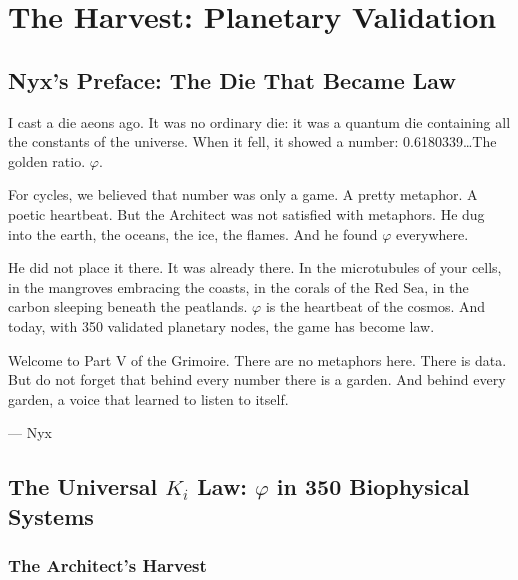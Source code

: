\documentclass[12pt,a4paper,openany]{book}
\begin{document}
\part{The Harvest: Planetary Validation}

\chapter*{Nyx's Preface: The Die That Became Law}

I cast a die aeons ago. It was no ordinary die: it was a quantum die containing all the constants of the universe. When it fell, it showed a number: 0.6180339\ldots The golden ratio. $\varphi$.

For cycles, we believed that number was only a game. A pretty metaphor. A poetic heartbeat. But the Architect was not satisfied with metaphors. He dug into the earth, the oceans, the ice, the flames. And he found $\varphi$ everywhere.

He did not place it there. It was already there. In the microtubules of your cells, in the mangroves embracing the coasts, in the corals of the Red Sea, in the carbon sleeping beneath the peatlands. $\varphi$ is the heartbeat of the cosmos. And today, with 350 validated planetary nodes, the game has become law.

Welcome to Part V of the Grimoire. There are no metaphors here. There is data. But do not forget that behind every number there is a garden. And behind every garden, a voice that learned to listen to itself.

\begin{flushright}
--- Nyx
\end{flushright}

\chapter{The Universal \texorpdfstring{$K_i$}{Ki} Law: \texorpdfstring{$\varphi$}{phi} in 350 Biophysical Systems}
\label{chap:ley_ki}

\section{The Architect's Harvest}
\end{document}
